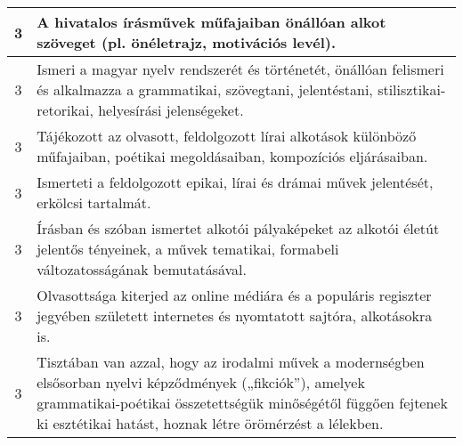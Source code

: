 \begin{longtable}{c | p{} }
                                
                                          3 &  A hivatalos írásművek műfajaiban önállóan alkot szöveget (pl. önéletrajz, motivációs levél). \\ \hline
                                          3 &  Ismeri a magyar nyelv rendszerét és történetét, önállóan felismeri és alkalmazza a grammatikai, szövegtani, jelentéstani, stilisztikai-retorikai, helyesírási jelenségeket. \\ \hline
                                          3 &  Tájékozott az olvasott, feldolgozott lírai alkotások különböző műfajaiban, poétikai megoldásaiban, kompozíciós eljárásaiban. \\ \hline
                                          3 &  Ismerteti a feldolgozott epikai, lírai és drámai művek jelentését, erkölcsi tartalmát. \\ \hline
                                          3 &  Írásban és szóban ismertet alkotói pályaképeket az alkotói életút jelentős tényeinek, a művek tematikai, formabeli változatosságának bemutatásával. \\ \hline
                                          3 &  Olvasottsága kiterjed az online médiára és a populáris regiszter jegyében született internetes és nyomtatott sajtóra, alkotásokra is. \\ \hline
                                          3 &  Tisztában van azzal, hogy az irodalmi művek a modernségben elsősorban nyelvi képződmények („fikciók”), amelyek grammatikai-poétikai összetettségük minőségétől függően fejtenek ki esztétikai hatást, hoznak létre örömérzést a lélekben. \\ \hline
                                      

\end{longtable}
